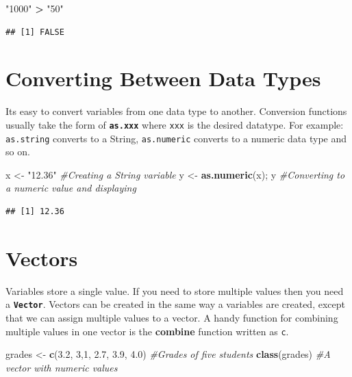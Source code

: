 \documentclass[]{krantz}
\makeatletter
\newenvironment{Shaded}{\begin{snugshade}}{\end{snugshade}}
\newcommand{\KeywordTok}[1]{\textcolor[rgb]{0.27,0.27,0.27}{\textbf{#1}}}
\newcommand{\DecValTok}[1]{\textcolor[rgb]{0.06,0.06,0.06}{#1}}
\newcommand{\FloatTok}[1]{\textcolor[rgb]{0.06,0.06,0.06}{#1}}
\newcommand{\StringTok}[1]{\textcolor[rgb]{0.5,0.5,0.5}{#1}}
\newcommand{\CommentTok}[1]{\textcolor[rgb]{0.56,0.35,0.01}{\textit{#1}}}
\newcommand{\OperatorTok}[1]{\textcolor[rgb]{0.81,0.36,0.00}{\textbf{#1}}}
\newcommand{\NormalTok}[1]{#1}
\newenvironment{kframe}{%
\medskip{}
\setlength{\fboxsep}{.8em}
 \def\at@end@of@kframe{}%
 \ifinner\ifhmode%
  \def\at@end@of@kframe{\end{minipage}}%
  \begin{minipage}{\columnwidth}%
 \fi\fi%
 \def\FrameCommand##1{\hskip\@totalleftmargin \hskip-\fboxsep
 \colorbox{shadecolor}{##1}\hskip-\fboxsep
     \hskip-\linewidth \hskip-\@totalleftmargin \hskip\columnwidth}%
 \MakeFramed {\advance\hsize-\width
   \@totalleftmargin\z@ \linewidth\hsize
   \@setminipage}}%
 {\par\unskip\endMakeFramed%
 \at@end@of@kframe}
\renewenvironment{Shaded}{\begin{kframe}}{\end{kframe}}
\theoremstyle{definition}
\theoremstyle{definition}
\theoremstyle{definition}
\theoremstyle{remark}
\makeatother
\begin{document}
\begin{Shaded}
\begin{Highlighting}[]
\StringTok{"1000"} \OperatorTok{>}\StringTok{ "50"}
\end{Highlighting}
\end{Shaded}

\begin{verbatim}
## [1] FALSE
\end{verbatim}

\section{Converting Between Data
Types}\label{converting-between-data-types}

Its easy to convert variables from one data type to another. Conversion
functions usually take the form of \textbf{\texttt{as.xxx}} where
\texttt{xxx} is the desired datatype. For example: \texttt{as.string}
converts to a String, \texttt{as.numeric} converts to a numeric data
type and so on.

\begin{Shaded}
\begin{Highlighting}[]
\NormalTok{x <-}\StringTok{ "12.36"} \CommentTok{#Creating a String variable}
\NormalTok{y <-}\StringTok{ }\KeywordTok{as.numeric}\NormalTok{(x); y }\CommentTok{#Converting to a numeric value and displaying}
\end{Highlighting}
\end{Shaded}

\begin{verbatim}
## [1] 12.36
\end{verbatim}

\section{Vectors}\label{vectors}

Variables store a single value. If you need to store multiple values
then you need a \textbf{\texttt{Vector}}. Vectors can be created in the
same way a variables are created, except that we can assign multiple
values to a vector. A handy function for combining multiple values in
one vector is the \textbf{combine} function written as \texttt{c}.

\begin{Shaded}
\begin{Highlighting}[]
\NormalTok{grades <-}\StringTok{ }\KeywordTok{c}\NormalTok{(}\FloatTok{3.2}\NormalTok{, }\DecValTok{3}\NormalTok{,}\DecValTok{1}\NormalTok{, }\FloatTok{2.7}\NormalTok{, }\FloatTok{3.9}\NormalTok{, }\FloatTok{4.0}\NormalTok{) }\CommentTok{#Grades of five students}
\KeywordTok{class}\NormalTok{(grades) }\CommentTok{#A vector with numeric values}
\end{Highlighting}
\end{Shaded}
\end{document}
